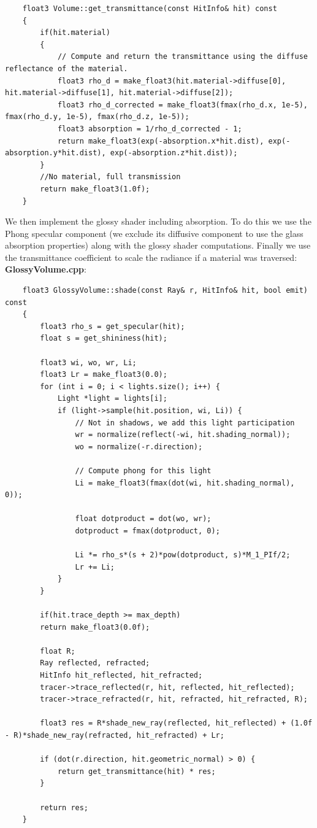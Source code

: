 \documentclass[a4,12pt]{article}
\begin{document}
	\begin{lstlisting}
	float3 Volume::get_transmittance(const HitInfo& hit) const
	{
		if(hit.material)
		{
			// Compute and return the transmittance using the diffuse reflectance of the material.
			float3 rho_d = make_float3(hit.material->diffuse[0], hit.material->diffuse[1], hit.material->diffuse[2]);
			float3 rho_d_corrected = make_float3(fmax(rho_d.x, 1e-5), fmax(rho_d.y, 1e-5), fmax(rho_d.z, 1e-5));
			float3 absorption = 1/rho_d_corrected - 1;
			return make_float3(exp(-absorption.x*hit.dist), exp(-absorption.y*hit.dist), exp(-absorption.z*hit.dist));
		}
		//No material, full transmission
		return make_float3(1.0f);
	}
	\end{lstlisting}
	
	We then implement the glossy shader including absorption. To do this we use the Phong specular component (we exclude its diffusive component to use the glass absorption properties) along with the glossy shader computations. Finally we use the transmittance coefficient to scale the radiance if a material was traversed:
	\textbf{GlossyVolume.cpp}:
	
	\begin{lstlisting}
	float3 GlossyVolume::shade(const Ray& r, HitInfo& hit, bool emit) const
	{
		float3 rho_s = get_specular(hit);
		float s = get_shininess(hit);
		
		float3 wi, wo, wr, Li;
		float3 Lr = make_float3(0.0);
		for (int i = 0; i < lights.size(); i++) {
			Light *light = lights[i];
			if (light->sample(hit.position, wi, Li)) {
				// Not in shadows, we add this light participation
				wr = normalize(reflect(-wi, hit.shading_normal));
				wo = normalize(-r.direction);
				
				// Compute phong for this light
				Li = make_float3(fmax(dot(wi, hit.shading_normal), 0));
				
				float dotproduct = dot(wo, wr);
				dotproduct = fmax(dotproduct, 0);
				
				Li *= rho_s*(s + 2)*pow(dotproduct, s)*M_1_PIf/2;
				Lr += Li;
			}
		}
		
		if(hit.trace_depth >= max_depth)
		return make_float3(0.0f);
		
		float R;
		Ray reflected, refracted;
		HitInfo hit_reflected, hit_refracted;
		tracer->trace_reflected(r, hit, reflected, hit_reflected);
		tracer->trace_refracted(r, hit, refracted, hit_refracted, R);
		
		float3 res = R*shade_new_ray(reflected, hit_reflected) + (1.0f - R)*shade_new_ray(refracted, hit_refracted) + Lr;
		
		if (dot(r.direction, hit.geometric_normal) > 0) {
			return get_transmittance(hit) * res;
		}
		
		return res;
	}
	\end{lstlisting}
	
\end{document}
